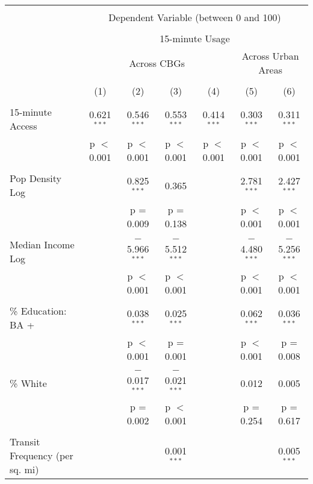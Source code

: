 
\begin{table}[!htbp] \centering 
  \caption{} 
  \label{} 
\begin{tabular}{@{\extracolsep{5pt}}lcccccc} 
\\[-1.8ex]\hline 
\hline \\[-1.8ex] 
 & \multicolumn{6}{c}{Dependent Variable (between 0 and 100)} \\ 
\cline{2-7} 
\\[-1.8ex] & \multicolumn{6}{c}{15-minute Usage} \\ 
 & \multicolumn{4}{c}{Across CBGs} & \multicolumn{2}{c}{Across Urban Areas} \\ 
\\[-1.8ex] & (1) & (2) & (3) & (4) & (5) & (6)\\ 
\hline \\[-1.8ex] 
 15-minute Access & 0.621$^{***}$ & 0.546$^{***}$ & 0.553$^{***}$ & 0.414$^{***}$ & 0.303$^{***}$ & 0.311$^{***}$ \\ 
  & p $<$ 0.001 & p $<$ 0.001 & p $<$ 0.001 & p $<$ 0.001 & p $<$ 0.001 & p $<$ 0.001 \\ 
  & & & & & & \\ 
 Pop Density Log &  & 0.825$^{***}$ & 0.365 &  & 2.781$^{***}$ & 2.427$^{***}$ \\ 
  &  & p = 0.009 & p = 0.138 &  & p $<$ 0.001 & p $<$ 0.001 \\ 
  & & & & & & \\ 
 Median Income Log &  & $-$5.966$^{***}$ & $-$5.512$^{***}$ &  & $-$4.480$^{***}$ & $-$5.256$^{***}$ \\ 
  &  & p $<$ 0.001 & p $<$ 0.001 &  & p $<$ 0.001 & p $<$ 0.001 \\ 
  & & & & & & \\ 
 \% Education: BA + &  & 0.038$^{***}$ & 0.025$^{***}$ &  & 0.062$^{***}$ & 0.036$^{***}$ \\ 
  &  & p $<$ 0.001 & p = 0.001 &  & p $<$ 0.001 & p = 0.008 \\ 
  & & & & & & \\ 
 \% White &  & $-$0.017$^{***}$ & $-$0.021$^{***}$ &  & 0.012 & 0.005 \\ 
  &  & p = 0.002 & p $<$ 0.001 &  & p = 0.254 & p = 0.617 \\ 
  & & & & & & \\ 
 Transit Frequency (per sq. mi) &  &  & 0.001$^{***}$ &  &  & 0.005$^{***}$ \\ 

\end{tabular}
\end{table}

